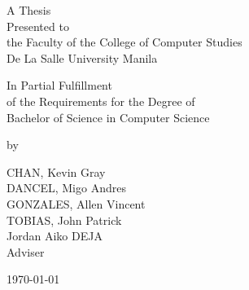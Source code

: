 %
%
%                 

\begin{titlepage}
\centering



\vspace{1.75cm}
A Thesis\\
Presented to\\
the Faculty of the College of Computer Studies\\
De La Salle University Manila

\vspace{1.75cm}
In Partial Fulfillment\\
of the Requirements for the Degree of\\
Bachelor of  Science in Computer Science

\vspace{1.75cm}
by\\
\vspace{1cm}

CHAN, Kevin Gray \\
DANCEL, Migo Andres  \\
GONZALES, Allen Vincent  \\
TOBIAS, John Patrick  \\

\vspace{1.75cm}
Jordan Aiko DEJA \\
Adviser

\vspace{1.75cm}
\today
\end{titlepage}
